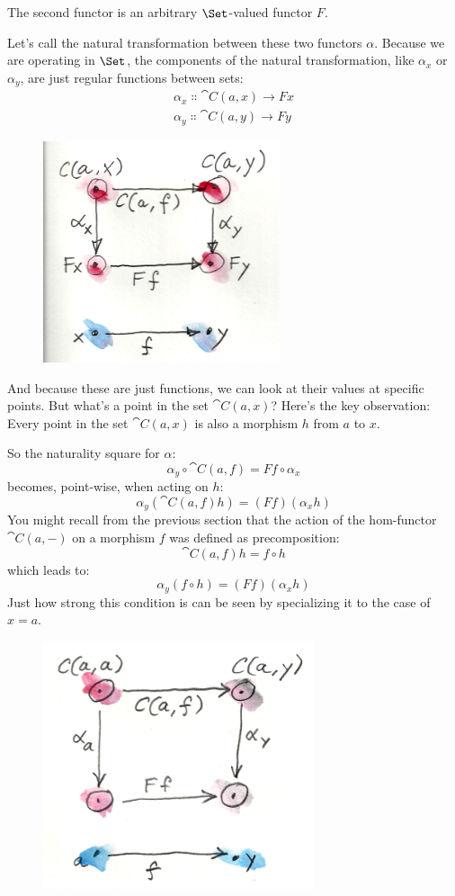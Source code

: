 The second functor is an arbitrary $\Set$-valued functor
$F$.

Let's call the natural transformation between these two functors
$\alpha$. Because we are operating in $\Set$, the components of
the natural transformation, like $\alpha_x$ or $\alpha_y$, are just
regular functions between sets:
\begin{gather*}
\alpha_x \Colon \cat{C}(a, x) \to F x \\
\alpha_y \Colon \cat{C}(a, y) \to F y
\end{gather*}

\begin{figure}[H]
\centering
\includegraphics[width=2.73958in]{images/yoneda1.png}
\end{figure}

\noindent
And because these are just functions, we can look at their values at
specific points. But what's a point in the set $\cat{C}(a, x)$? Here's
the key observation: Every point in the set $\cat{C}(a, x)$ is also a
morphism $h$ from $a$ to $x$.

So the naturality square for $\alpha$:
\[\alpha_y \circ \cat{C}(a, f) = F f \circ \alpha_x\]
becomes, point-wise, when acting on $h$:
\[\alpha_y (\cat{C}(a, f) h) = (F f) (\alpha_x h)\]
You might recall from the previous section that the action of the
hom-functor $\cat{C}(a,-)$ on a morphism $f$ was defined as
precomposition:
\[\cat{C}(a, f) h = f \circ h\]
which leads to:
\[\alpha_y (f \circ h) = (F f) (\alpha_x h)\]
Just how strong this condition is can be seen by specializing it to the
case of $x = a$.

\begin{figure}[H]
\centering
\includegraphics[width=3.12500in]{images/yoneda2.png}
\end{figure}

